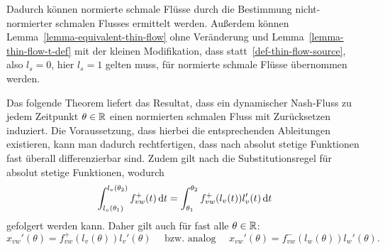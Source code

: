 Dadurch können normierte schmale Flüsse durch die Bestimmung nicht-normier\-ter schmalen Flusses ermittelt werden.
Außerdem können Lemma~\ref{lemma-equivalent-thin-flow} ohne Verän\-derung und Lemma~\ref{lemma-thin-flow-t-def} mit der kleinen Modifikation, dass statt~\ref{def-thin-flow-source}, also $l_s = 0$, hier $l_s = 1$ gelten muss, für normierte schmale Flüsse übernommen werden.

Das folgende Theorem liefert das Resultat, dass ein dynamischer Nash-Fluss zu jedem Zeitpunkt $\theta\in\mathbb{R}$ einen normierten schmalen Fluss mit Zurücksetzen induziert.
Die Voraussetzung, dass hierbei die entsprechenden Ableitungen existieren, kann man dadurch rechtfertigen, dass nach \cite[Kap. VII, Folgerung~4.12~b)]{Elstrodt2011} absolut stetige Funktionen fast überall differenzierbar sind.
Zudem gilt nach \cite[Kap. VII, Aufgabe~4.10]{Elstrodt2011} die Substitutionsregel für absolut stetige Funktionen, wodurch
\[
\int_{l_v(\theta_1)}^{l_v(\theta_2)} f_{vw}^+(t) \mathop{}\!\mathrm{d} t = \int_{\theta_1}^{\theta_2} f_{vw}^+(l_v(t)) l_v'(t) \mathop{}\!\mathrm{d} t
\]
gefolgert werden kann.
Daher gilt auch für fast alle $\theta\in\mathbb{R}$:
\[ 
x_{vw}'(\theta) = f_{vw}^+(l_v(\theta))l_v'(\theta) \text{~~~ bzw. analog ~~~} x_{vw}'(\theta) = f_{vw}^-(l_w(\theta)) l_w'(\theta).
\]

